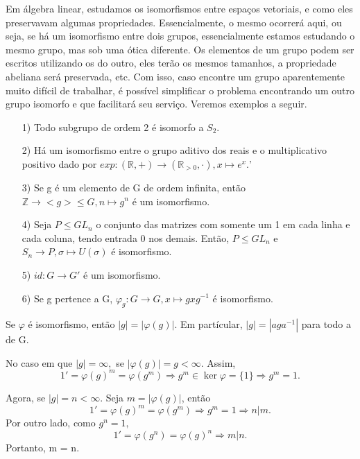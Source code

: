 \documentclass[Algebra/algebra_notes.tex]{subfiles}
\begin{document}
Em álgebra linear, estudamos os isomorfismos entre espaços vetoriais, e como eles preservavam algumas propriedades. Essencialmente,
o mesmo ocorrerá aqui, ou seja, se há um isomorfismo entre dois grupos, essencialmente estamos estudando o mesmo grupo, mas sob uma ótica diferente.
Os elementos de um grupo podem ser escritos utilizando os do outro, eles terão os mesmos tamanhos, a propriedade abeliana será preservada, etc.
Com isso, caso encontre um grupo aparentemente muito difícil de trabalhar, é possível simplificar o problema encontrando um outro grupo
isomorfo e que facilitará seu serviço. Veremos exemplos a seguir.
\begin{example*}
	\begin{itemize}
		\item[1)] Todo subgrupo de ordem 2 é isomorfo a $S_{2}$.
		\item[2)] Há um isomorfismo entre o grupo aditivo dos reais e o multiplicativo positivo dado por $exp:(\mathbb{R}, +)\rightarrow (\mathbb{R}_{>0}, \cdot), x\mapsto e^{x}.$'
		\item[3)] Se g é um elemento de G de ordem infinita, então $\mathbb{Z}\rightarrow <g>\leq{G}, n\mapsto g^{n}$ é um isomorfismo.
		\item[4)] Seja $P\leq{GL_{n}}$ o conjunto das matrizes com somente um 1 em cada linha e cada coluna, tendo entrada 0 nos demais. Então,
		      $P\leq{GL_{n}}$ e $S_{n}\rightarrow P, \sigma\mapsto U(\sigma)$ é isomorfismo.
		\item[5)] $id:G\rightarrow G'$ é um isomorfismo.
		\item[6)] Se g pertence a G, $\varphi_{g}:G\rightarrow G, x\mapsto gxg^{-1}$ é isomorfismo.
	\end{itemize}
\end{example*}
\begin{prop*}
	Se $\varphi$ é isomorfismo, então $|g| = |\varphi(g)|$. Em partícular, $|g| = |aga^{-1}|$ para todo a de G.
\end{prop*}
\begin{proof*}
	No caso em que $|g| = \infty,$ se $|\varphi(g)| = g < \infty$. Assim,
	$$
		1' = \varphi(g)^{m} = \varphi(g^{m}) \Rightarrow g^{m}\in\ker{\varphi} = \{1\} \Rightarrow g^{m} = 1.
	$$

	Agora, se $|g| = n <\infty$. Seja $m = |\varphi(g)|$, então
	$$
		1' = \varphi(g)^{m} = \varphi(g^{m}) \Rightarrow g^{m} = 1 \Rightarrow n|m.
	$$
	Por outro lado, como $g^{n} = 1,$
	$$
		1' = \varphi(g^{n}) = \varphi(g)^{n} \Rightarrow m|n.
	$$
	Portanto, m = n. \qedsymbol
\end{proof*}
\end{document}

